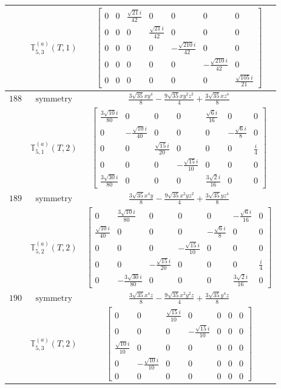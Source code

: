 \documentclass[fleqn,8pt,landscape]{jsarticle}
\begin{document}
\begin{longtable}{ccc}
$  $ & $ \mathbb{T}_{5,3}^{(a)}(T,1) $ & $ \begin{bmatrix} 0 & 0 & \frac{\sqrt{21} i}{42} & 0 & 0 & 0 & 0 \\ 0 & 0 & 0 & \frac{\sqrt{21} i}{42} & 0 & 0 & 0 \\ 0 & 0 & 0 & 0 & - \frac{\sqrt{210} i}{42} & 0 & 0 \\ 0 & 0 & 0 & 0 & 0 & - \frac{\sqrt{210} i}{42} & 0 \\ 0 & 0 & 0 & 0 & 0 & 0 & \frac{\sqrt{105} i}{21} \end{bmatrix} $ \\ \hline
$ 188 $ & $ \text{symmetry} $ & $ \frac{3 \sqrt{35} x y^{4}}{8} - \frac{9 \sqrt{35} x y^{2} z^{2}}{4} + \frac{3 \sqrt{35} x z^{4}}{8} $ \\
$  $ & $ \mathbb{T}_{5,1}^{(a)}(T,2) $ & $ \begin{bmatrix} \frac{3 \sqrt{10} i}{80} & 0 & 0 & 0 & \frac{\sqrt{6} i}{16} & 0 & 0 \\ 0 & - \frac{\sqrt{10} i}{40} & 0 & 0 & 0 & - \frac{\sqrt{6} i}{8} & 0 \\ 0 & 0 & \frac{\sqrt{15} i}{20} & 0 & 0 & 0 & \frac{i}{4} \\ 0 & 0 & 0 & - \frac{\sqrt{15} i}{10} & 0 & 0 & 0 \\ \frac{3 \sqrt{30} i}{80} & 0 & 0 & 0 & \frac{3 \sqrt{2} i}{16} & 0 & 0 \end{bmatrix} $ \\ \hline
$ 189 $ & $ \text{symmetry} $ & $ \frac{3 \sqrt{35} x^{4} y}{8} - \frac{9 \sqrt{35} x^{2} y z^{2}}{4} + \frac{3 \sqrt{35} y z^{4}}{8} $ \\
$  $ & $ \mathbb{T}_{5,2}^{(a)}(T,2) $ & $ \begin{bmatrix} 0 & \frac{3 \sqrt{10} i}{80} & 0 & 0 & 0 & - \frac{\sqrt{6} i}{16} & 0 \\ \frac{\sqrt{10} i}{40} & 0 & 0 & 0 & - \frac{\sqrt{6} i}{8} & 0 & 0 \\ 0 & 0 & 0 & - \frac{\sqrt{15} i}{10} & 0 & 0 & 0 \\ 0 & 0 & - \frac{\sqrt{15} i}{20} & 0 & 0 & 0 & \frac{i}{4} \\ 0 & - \frac{3 \sqrt{30} i}{80} & 0 & 0 & 0 & \frac{3 \sqrt{2} i}{16} & 0 \end{bmatrix} $ \\ \hline
$ 190 $ & $ \text{symmetry} $ & $ \frac{3 \sqrt{35} x^{4} z}{8} - \frac{9 \sqrt{35} x^{2} y^{2} z}{4} + \frac{3 \sqrt{35} y^{4} z}{8} $ \\
$  $ & $ \mathbb{T}_{5,3}^{(a)}(T,2) $ & $ \begin{bmatrix} 0 & 0 & \frac{\sqrt{15} i}{10} & 0 & 0 & 0 & 0 \\ 0 & 0 & 0 & - \frac{\sqrt{15} i}{10} & 0 & 0 & 0 \\ \frac{\sqrt{10} i}{10} & 0 & 0 & 0 & 0 & 0 & 0 \\ 0 & - \frac{\sqrt{10} i}{10} & 0 & 0 & 0 & 0 & 0 \\ 0 & 0 & 0 & 0 & 0 & 0 & 0 \end{bmatrix} $ \\ \hline

\end{longtable}
\end{document}
